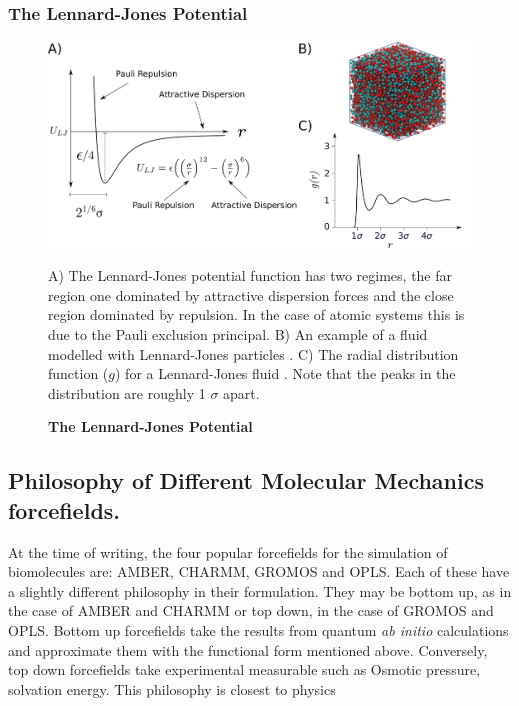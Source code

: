 \subsubsection{The Lennard-Jones Potential}
\begin{figure}
	\begin{center}
		\includegraphics[width=\textwidth]{figures/LJ_figure.pdf}
	\end{center}
	\captionsetup{singlelinecheck = false, justification=raggedright}
	\caption[The Lennard-Jones Potential] {\textbf{The Lennard-Jones Potential}}{A) The Lennard-Jones potential function has two regimes, the far region one dominated by attractive dispersion forces and the close region dominated by repulsion. In the case of atomic systems this is due to the Pauli exclusion principal. B) An example of a fluid modelled with Lennard-Jones particles \cite{chari2019}. C) The radial distribution function ($g$) for a Lennard-Jones fluid \cite{morsali2005}. Note that the peaks in the distribution are roughly 1 $\sigma$ apart. }
	\label{Lennard-Jones_figure}
\end{figure}

\subsection{Philosophy of Different Molecular Mechanics forcefields.}
At the time of writing, the four popular forcefields for the simulation of biomolecules are: AMBER, CHARMM, GROMOS and OPLS. Each of these have a slightly different philosophy in their formulation. They may be bottom up, as in the case of AMBER and CHARMM or top down, in the case of GROMOS and OPLS. Bottom up forcefields take the results from quantum \textit{ab initio} calculations and approximate them with the functional form mentioned above. Conversely, top down forcefields take experimental measurable such as Osmotic pressure, solvation energy. This philosophy is closest to physics 


